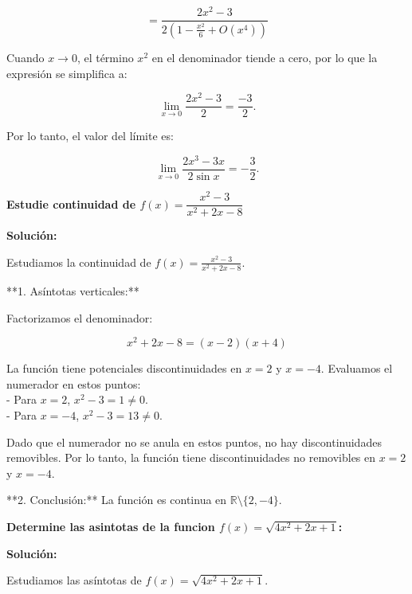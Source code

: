 \documentclass[answers]{exam}
\begin{document}
\begin{questions}
\begin{solution}
\begin{parts}
			\[
				= \frac{2x^2 - 3}{2\left(1 - \frac{x^2}{6} + O(x^4)\right)}
			\]
	
			Cuando $x \to 0$, el término $x^2$ en el denominador tiende a cero, por lo que la expresión se simplifica a:
	
			\[
				\lim_{x \to 0} \frac{2x^2 - 3}{2} = \frac{-3}{2}.
			\]
	
			Por lo tanto, el valor del límite es:
	
			\[
				\lim_{x \to 0} \frac{2x^3 - 3x}{2 \sin x} = -\frac{3}{2}.
			\]
			
		\end{parts}

	





	\end{solution}


	\question \large\textbf{Estudie continuidad de $f(x)=\dfrac{x^2-3}{x^2+2x-8}$}

	\begin{solution}
		\textbf{Solución:}
	
		Estudiamos la continuidad de \( f(x) = \frac{x^2 - 3}{x^2 + 2x - 8} \).
	
		**1. Asíntotas verticales:** 
	
		Factorizamos el denominador:
	
		\[
		x^2 + 2x - 8 = (x - 2)(x + 4)
		\]
	
		La función tiene potenciales discontinuidades en \( x = 2 \) y \( x = -4 \). Evaluamos el numerador en estos puntos: \\
	
		- Para \( x = 2 \), \( x^2 - 3 = 1 \neq 0 \).\\
		- Para \( x = -4 \), \( x^2 - 3 = 13 \neq 0 \).
	
		Dado que el numerador no se anula en estos puntos, no hay discontinuidades removibles. Por lo tanto, la función tiene discontinuidades no removibles en \( x = 2 \) y \( x = -4 \).
	
		**2. Conclusión:** La función es continua en \( \mathbb{R} \setminus \{2, -4\} \).
	\end{solution}
	
	
	\question \large\textbf{Determine las asintotas de la funcion $f(x)=\sqrt{4x^2+2x+1}$:}

	\begin{solution}
		\textbf{Solución:}
	
		Estudiamos las asíntotas de \( f(x) = \sqrt{4x^2 + 2x + 1} \).
	

\end{solution}
\end{questions}
\end{document}
